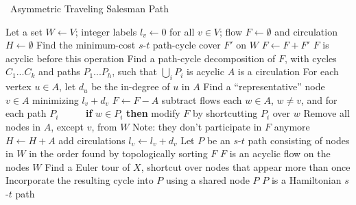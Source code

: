 \documentclass[11pt]{article}
\begin{document}
\medskip




\begin{algorithm*}[ht]
  \caption{~Asymmetric Traveling Salesman Path} \label{alg:ig} 
\begin{algorithmic}[1] 
\State Let a set $W \leftarrow V$; integer labels $l_v \leftarrow 0$ for all $v\in V$; flow $F \leftarrow \emptyset$ and circulation $H \leftarrow \emptyset$  \label{line:one}
 \label{line:iter}
\State Find the minimum-cost $s$-$t$ path-cycle cover $F'$ on $W$ 
\label{line:findflow}
\State $F\leftarrow F+F'$ \label{line:addf}
\Comment $F$ is acyclic before this operation
\State Find a path-cycle decomposition of $F$, with cycles $C_1...C_k$ and paths $P_1...P_h$, such that $\bigcup_i P_i$ is acyclic
 \label{line:finda}
\Comment $A$ is a circulation
\State For each vertex $u\in A$, let $d_u$ be the in-degree of $u$ in $A$
\State Find a ``representative'' node $v\in A$ minimizing $l_v+d_v$ \label{line:findv}
\State $F \leftarrow F - A$
\Comment subtract flows
 each $w\in A$, $w\neq v$, and for each path $P_i$ 
\State ~~~~~{\bf if} $w\in P_i$ {\bf then} modify $F$ by shortcutting $P_i$ over $w$
\State Remove all nodes in $A$, except $v$, from $W$ \label{line:delw}
\Comment Note: they don't participate in $F$ anymore
\State $H\leftarrow H+A$
\Comment add circulations
\State $l_v \leftarrow l_v+d_v$
\EndFor
\EndFor \label{line:endfor}
\State Let $P$ be an $s$-$t$ path consisting of nodes in $W$ in the order found by  	topologically sorting $F$ \label{line:findp} \newline \mbox{}
\Comment $F$ is an acyclic flow on the nodes $W$
 \label{line:cyc}
\State Find a Euler tour of $X$, shortcut over nodes that appear more than once \label{line:euler}
\State Incorporate the resulting cycle into $P$ using a shared node \label{line:inc}
\EndFor \label{line:endcyc}
 $P$
\Comment $P$ is a Hamiltonian $s$-$t$ path
\end{algorithmic}
\end{algorithm*}
\end{document}
